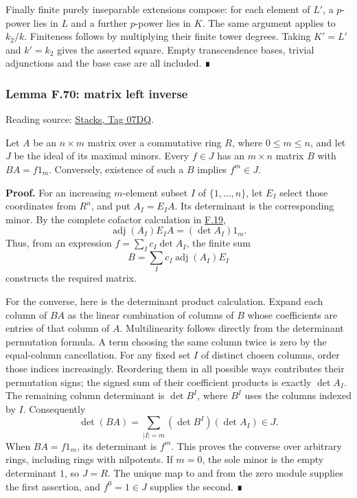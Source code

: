 \documentclass[11pt,a4paper,openany]{report}
\begin{document}
Finally finite purely inseparable extensions compose: for each element of \(L'\), a \(p\)-power lies in \(L\) and a further \(p\)-power lies in \(K\). The same argument applies to \(k_2/k\). Finiteness follows by multiplying their finite tower degrees. Taking \(K'=L'\) and \(k'=k_2\) gives the asserted square. Empty transcendence bases, trivial adjunctions and the base case are all included. ∎

\label{AG-RG-S05-algebra-lemma-matrix-left-inverse}

\subsubsection{Lemma F.70: matrix left inverse}\label{AG-RG-S05-lemma-f.70-matrix-left-inverse}

Reading source: \href{https://stacks.math.columbia.edu/tag/07DQ}{Stacks, Tag 07DQ}.

Let \(A\) be an \(n\times m\) matrix over a commutative ring \(R\), where \(0\leq m\leq n\), and let \(J\) be the ideal of its maximal minors. Every \(f\in J\) has an \(m\times n\) matrix \(B\) with \(BA=f1_m\). Conversely, existence of such a \(B\) implies \(f^m\in J\).

\textbf{Proof.} For an increasing \(m\)-element subset \(I\) of \(\{1,\ldots,n\}\), let \(E_I\) select those coordinates from \(R^n\), and put \(A_I=E_IA\). Its determinant is the corresponding minor. By the complete cofactor calculation in \hyperref[AG-RG-S05-algebra-lemma-charpoly]{F.19}, \[
\operatorname{adj}(A_I)E_IA=(\det A_I)1_m.
\] Thus, from an expression \(f=\sum_I c_I\det A_I\), the finite sum \[
B=\sum_I c_I\operatorname{adj}(A_I)E_I
\] constructs the required matrix.

For the converse, here is the determinant product calculation. Expand each column of \(BA\) as the linear combination of columns of \(B\) whose coefficients are entries of that column of \(A\). Multilinearity follows directly from the determinant permutation formula. A term choosing the same column twice is zero by the equal-column cancellation. For any fixed set \(I\) of distinct chosen columns, order those indices increasingly. Reordering them in all possible ways contributes their permutation signs; the signed sum of their coefficient products is exactly \(\det A_I\). The remaining column determinant is \(\det B^I\), where \(B^I\) uses the columns indexed by \(I\). Consequently \[
\det(BA)=\sum_{|I|=m}(\det B^I)(\det A_I)\in J.
\] When \(BA=f1_m\), its determinant is \(f^m\). This proves the converse over arbitrary rings, including rings with nilpotents. If \(m=0\), the sole minor is the empty determinant \(1\), so \(J=R\). The unique map to and from the zero module supplies the first assertion, and \(f^0=1\in J\) supplies the second. ∎
\end{document}
